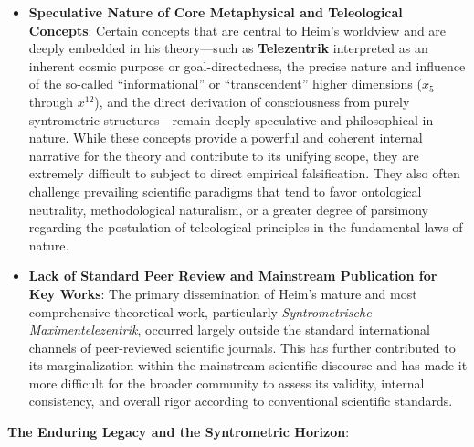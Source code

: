 \documentclass[
    12pt,              %
    a4paper,           %
    headings=normal,   %
    twoside=true,      %
    BCOR=8mm,          %
]{scrbook}
\newcommand{\q}[1]{\enquote{#1}}
\begin{document}
\begin{itemize}
    \item \textbf{Speculative Nature of Core Metaphysical and Teleological Concepts}: Certain concepts that are central to Heim's worldview and are deeply embedded in his theory—such as \textbf{Telezentrik} interpreted as an inherent cosmic purpose or goal-directedness, the precise nature and influence of the so-called \enquote{informational} or \q{transcendent} higher dimensions (\(x_5\) through \(x^{12}\)), and the direct derivation of consciousness from purely syntrometric structures—remain deeply speculative and philosophical in nature. While these concepts provide a powerful and coherent internal narrative for the theory and contribute to its unifying scope, they are extremely difficult to subject to direct empirical falsification. They also often challenge prevailing scientific paradigms that tend to favor ontological neutrality, methodological naturalism, or a greater degree of parsimony regarding the postulation of teleological principles in the fundamental laws of nature.
    \item \textbf{Lack of Standard Peer Review and Mainstream Publication for Key Works}: The primary dissemination of Heim's mature and most comprehensive theoretical work, particularly \textit{Syntrometrische Maximentelezentrik}, occurred largely outside the standard international channels of peer-reviewed scientific journals. This has further contributed to its marginalization within the mainstream scientific discourse and has made it more difficult for the broader community to assess its validity, internal consistency, and overall rigor according to conventional scientific standards.
\end{itemize}

\textbf{The Enduring Legacy and the Syntrometric Horizon}:
\end{document}
